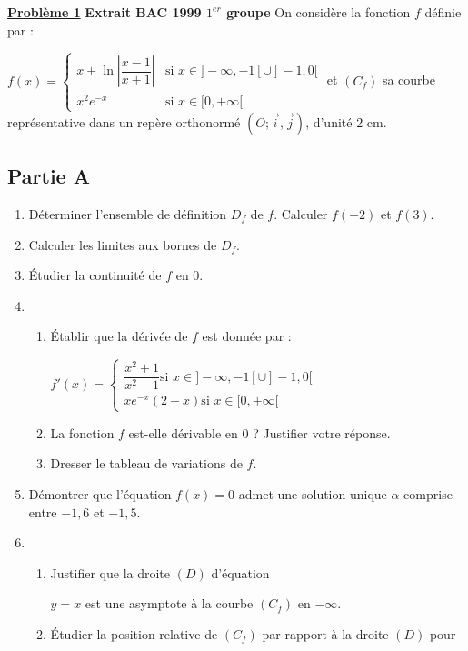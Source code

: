 \documentclass[12pt,a4paper]{article}
\newcommand{\exo}[1]{%
        \textbf{\underline{Problème #1}}
}
\begin{document}
\begin{multicols}{2}
\small
\setlength{\columnseprule}{0.1mm}

\exo{1} \textbf{Extrait BAC 1999 $1^{er}$ groupe}
On considère la fonction \( f \) définie par :

\( 
f(x) =
\begin{cases}
x + \ln\left|\dfrac{x - 1}{x + 1}\right| & \text{si } x \in ]-\infty, -1[ \cup ]-1, 0[ \\
x^2 e^{-x} & \text{si } x \in [0, +\infty[
\end{cases}
\)
et \( (C_f) \) sa courbe représentative dans un repère orthonormé \( (O; \vec{i}, \vec{j}) \), d’unité 2 cm.

\subsection*{Partie A}
\begin{enumerate}
  \item Déterminer l’ensemble de définition \( D_f \) de \( f \). Calculer \( f(-2) \) et \( f(3) \).
  \item Calculer les limites aux bornes de \( D_f \).
  \item Étudier la continuité de \( f \) en 0.
  \item 
  \begin{enumerate}
    \item Établir que la dérivée de \( f \) est donnée par :
    
\(
    f'(x) =
    \begin{cases}
    \dfrac{x^2 + 1}{x^2 - 1}  \text{si } x \in ]-\infty, -1[ \cup ]-1, 0[ \\
    x e^{-x}(2 - x) \text{si } x \in [0, +\infty[
    \end{cases}
\)
    \item La fonction \( f \) est-elle dérivable en 0 ? Justifier votre réponse.
    \item Dresser le tableau de variations de \( f \).
  \end{enumerate}
  \item Démontrer que l’équation \( f(x) = 0 \) admet une solution unique \( \alpha \) comprise entre \( -1{,}6 \) et \( -1{,}5 \).
  \item 
  \begin{enumerate}
    \item Justifier que la droite \( (D) \) d’équation 
    
    \( y = x \) est une asymptote à la courbe \( (C_f) \) en \( -\infty \).
    \item Étudier la position relative de \( (C_f) \) par rapport à la droite \( (D) \) pour
    

\end{enumerate}
\end{enumerate}
\end{multicols}
\end{document}
